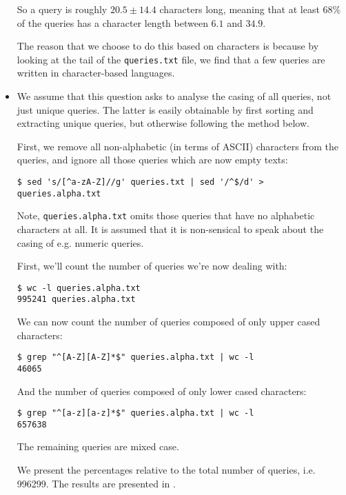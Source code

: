 \begin{itemize}
So a query is roughly $20.5\pm 14.4$ characters long, meaning that at least
68\% of the queries has a character length between $6.1$ and $34.9$.

The reason that we choose to do this based on characters is because by looking
at the tail of the \texttt{queries.txt} file, we find that a few queries are
written in character-based languages. 

\item

We assume that this question asks to analyse the casing of all queries, not
just unique queries. The latter is easily obtainable by first sorting and
extracting unique queries, but otherwise following the method below.

First, we remove all non-alphabetic (in terms of ASCII) characters from the
queries, and ignore all those queries which are now empty texts:

\begin{verbatim}
$ sed 's/[^a-zA-Z]//g' queries.txt | sed '/^$/d' > queries.alpha.txt
\end{verbatim}

Note, \texttt{queries.alpha.txt} omits those queries that have no alphabetic
characters at all. It is assumed that it is non-sensical to speak about the
casing of e.g. numeric queries.

First, we'll count the number of queries we're now dealing with:

\begin{verbatim}
$ wc -l queries.alpha.txt 
995241 queries.alpha.txt
\end{verbatim}

We can now count the number of queries composed of only upper cased characters:

\begin{verbatim}
$ grep "^[A-Z][A-Z]*$" queries.alpha.txt | wc -l
46065
\end{verbatim}

And the number of queries composed of only lower cased characters:

\begin{verbatim}
$ grep "^[a-z][a-z]*$" queries.alpha.txt | wc -l
657638
\end{verbatim}

The remaining queries are mixed case.

We present the percentages relative to the total number of queries, i.e.
996299. The results are presented in .


\end{itemize}
